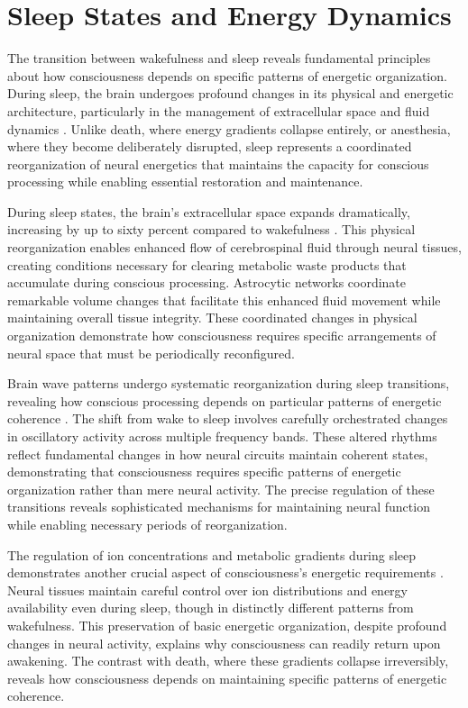 \section{Sleep States and Energy Dynamics}

The transition between wakefulness and sleep reveals fundamental principles about how consciousness depends on specific patterns of energetic organization. During sleep, the brain undergoes profound changes in its physical and energetic architecture, particularly in the management of extracellular space and fluid dynamics \cite{Xie2013}. Unlike death, where energy gradients collapse entirely, or anesthesia, where they become deliberately disrupted, sleep represents a coordinated reorganization of neural energetics that maintains the capacity for conscious processing while enabling essential restoration and maintenance.

During sleep states, the brain's extracellular space expands dramatically, increasing by up to sixty percent compared to wakefulness \cite{Nedergaard2020}. This physical reorganization enables enhanced flow of cerebrospinal fluid through neural tissues, creating conditions necessary for clearing metabolic waste products that accumulate during conscious processing. Astrocytic networks coordinate remarkable volume changes that facilitate this enhanced fluid movement while maintaining overall tissue integrity. These coordinated changes in physical organization demonstrate how consciousness requires specific arrangements of neural space that must be periodically reconfigured.

Brain wave patterns undergo systematic reorganization during sleep transitions, revealing how conscious processing depends on particular patterns of energetic coherence \cite{Scammell2017}. The shift from wake to sleep involves carefully orchestrated changes in oscillatory activity across multiple frequency bands. These altered rhythms reflect fundamental changes in how neural circuits maintain coherent states, demonstrating that consciousness requires specific patterns of energetic organization rather than mere neural activity. The precise regulation of these transitions reveals sophisticated mechanisms for maintaining neural function while enabling necessary periods of reorganization.

The regulation of ion concentrations and metabolic gradients during sleep demonstrates another crucial aspect of consciousness's energetic requirements \cite{DiNuzzo2017}. Neural tissues maintain careful control over ion distributions and energy availability even during sleep, though in distinctly different patterns from wakefulness. This preservation of basic energetic organization, despite profound changes in neural activity, explains why consciousness can readily return upon awakening. The contrast with death, where these gradients collapse irreversibly, reveals how consciousness depends on maintaining specific patterns of energetic coherence.

